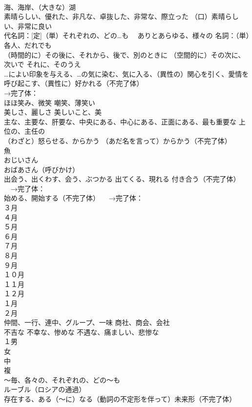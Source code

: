 \documentclass[8pt]{extreport}
\begin{document}
\begin{CJK}{UTF8}{min}
\\	海、海岸、（大きな）湖
\\	素晴らしい、優れた、非凡な、卓抜した、非常な、際立った （口）素晴らしい、非常に良い
\\	代名詞：[定]（単）それぞれの、どの…も 　ありとあらゆる、様々の 名詞：（単）各人、だれでも
\\	（時間的に）その後に、それから、後で、別のときに （空間的に）その次に、次いで それに、そのうえ
\\	…によい印象を与える、…の気に染む、気に入る、（異性の）関心を引く、愛情を呼び起こす、（異性に）好かれる（不完了体） 
\\	→完了体：
\\	ほほ笑み、微笑 嘲笑、薄笑い
\\	美しさ、麗しさ 美しいこと、美
\\	主な、主要な、肝要な、中央にある、中心にある、正面にある、最も重要な 上位の、主任の
\\	（わざと）怒らせる、からかう （あだ名を言って）からかう（不完了体）
\\	魚
\\	おじいさん
\\	おばあさん（呼びかけ）
\\	出会う、出くわす、会う、ぶつかる 出てくる、現れる 付き合う（不完了体） 　→完了体：
\\	始める、開始する（不完了体） 　→完了体：
\\	３月
\\	４月
\\	５月
\\	６月
\\	７月
\\	８月
\\	９月
\\	１０月
\\	１１月
\\	１２月
\\	１月
\\	２月
\\	仲間、一行、連中、グループ、一味 商社、商会、会社
\\	不吉な 不幸な、惨めな 不遇な、痛ましい、悲惨な
\\	１男
\\	女
\\	中
\\	複
\\	～毎、各々の、それぞれの、どの〜も
\\	ルーブル（ロシアの通過）
\\	存在する、ある（〜に）なる（動詞の不定形を伴って）未来形（不完了体）

\end{CJK}
\end{document}
